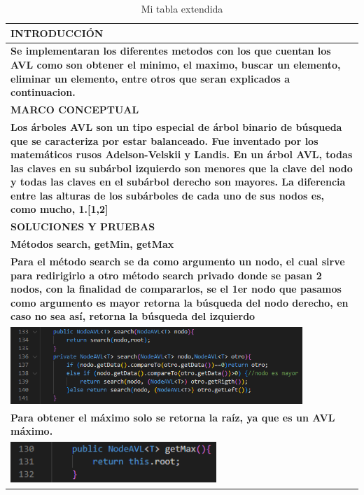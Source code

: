 \documentclass[9pt]{article}
\begin{document}
	\begin{longtable}{|p{15cm}|}
		\caption{Mi tabla extendida}\\
		\hline 
		\rowcolor{tablebackground}
		\color{white}\textbf{INTRODUCCIÓN}  \\
		\hline 
		\textbf{Se implementaran los diferentes metodos con los que cuentan los AVL
		como son obtener el minimo, el maximo, buscar un elemento, eliminar un elemento,
		entre otros que seran explicados a continuacion.}  \\
		\hline 
		\rowcolor{tablebackground}
		\color{white}\textbf{MARCO CONCEPTUAL}  \\
		\hline 
		\textbf{Los árboles AVL son un tipo especial de árbol binario 
		de búsqueda que se caracteriza por estar balanceado. 
		Fue inventado por los matemáticos rusos Adelson-Velskii y Landis.
		 En un árbol AVL, todas las claves en su subárbol izquierdo 
		 son menores que la clave del nodo y todas las claves en el
		  subárbol derecho son mayores. La diferencia entre las alturas
		   de los subárboles de cada uno de sus nodos es, como mucho, 1.[1,2]}  \\
		\hline 
		\rowcolor{tablebackground}
		\color{white}\textbf{SOLUCIONES Y PRUEBAS}  \\
		\hline 
		\textbf{Métodos search, getMin, getMax}\\
		\textbf{Para el método search se da como argumento un nodo,
		 el cual sirve para redirigirlo a otro método search privado 
		 donde se pasan 2 nodos, con la finalidad de compararlos, 
		 se el 1er nodo que pasamos como argumento es mayor retorna
		  la búsqueda del nodo derecho, en caso no sea así, retorna
		   la búsqueda del izquierdo}\\
		\includegraphics[width=0.85\textwidth,keepaspectratio]{img/search.png}\\
		\textbf{Para obtener el máximo solo se retorna la raíz, ya que es un AVL máximo.		}\\
		\includegraphics[width=0.6\textwidth,keepaspectratio]{img/getMax.png}\\

\end{longtable}
\end{document}
